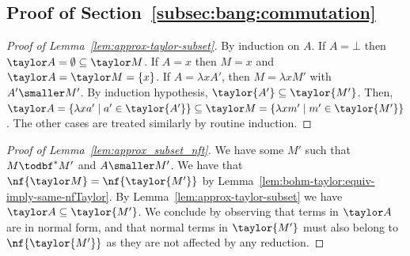 
\subsection{Proof of Section~\ref{subsec:bang:commutation}}

\begin{proof}[Proof of Lemma~\ref{lem:approx-taylor-subset}]
	By induction on $A$. If $A=\bot$ then $\taylor
	A=\emptyset\subseteq\taylor M$. If $A=x$ then $M=x$ and $\taylor
	A=\taylor M=\{x\}$. If $A=\lambda xA'$, then $M=\lambda xM'$ with $A'\smaller
	M'$. By induction hypothesis, $\taylor{ A'}\subseteq\taylor {M'}$. Then,
	$\taylor A=\{\lambda xa'\mid a'\in\taylor {A'}\}\subseteq\taylor M=\{\lambda
	xm'\mid m'\in\taylor {M'}\}$. The other cases are treated similarly by routine
	induction.
\end{proof}


\begin{proof}[Proof of Lemma~\ref{lem:approx_subset_nft}]
	We have some $M'$ such that $M\todbf^* M'$ and $A\smaller M'$. We have
	that $\nf{\taylor M}=\nf{\taylor{M'}}$ by Lemma~\ref{lem:bohm-taylor:equiv-imply-same-nfTaylor}.
	By Lemma~\ref{lem:approx-taylor-subset} we have $\taylor A\subseteq\taylor{M'}$. We conclude by
	observing that terms in $\taylor A$ are in normal form, and that normal terms in
	$\taylor {M'}$ must also belong to $\nf{\taylor{M'}}$ as they are not affected
	by any reduction.
\end{proof}

